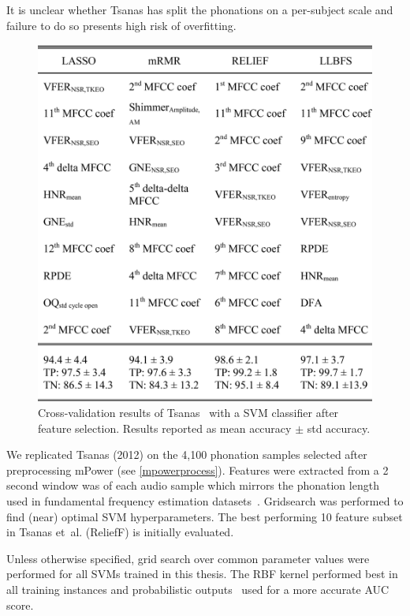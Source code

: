 \documentclass[12pt, twoside]{book}
\begin{document}
\begin{highlight}
It is unclear whether Tsanas has split the phonations on a per-subject scale and failure to do so presents high risk of overfitting.
\end{highlight}

\begin{figure}[h]
\caption{Cross-validation results of Tsanas~\cite{tsanas2012novel} with a SVM classifier after feature selection. Results reported as mean accuracy $\pm$ std accuracy.}
\label{tsanasresults}
\centering\includegraphics[width=0.75\linewidth]{tsanas.png}
\end{figure}
 
We replicated Tsanas (2012) on the 4,100 phonation samples selected after preprocessing mPower (see \ref{mpowerprocess}). Features were extracted from a 2 second window was of each audio sample which mirrors the phonation length used in fundamental frequency estimation datasets~\cite{tsanas2014robust}. Gridsearch was performed to find (near) optimal SVM hyperparameters. The best performing 10 feature subset in Tsanas et~al. (ReliefF) is initially evaluated.

\begin{highlight}
	Unless otherwise specified, grid search over common parameter values were performed for all SVMs trained in this thesis. The RBF kernel performed best in all training instances and probabilistic outputs~\cite{svmprobabilistic} used for a more accurate AUC score.
\end{highlight}
\end{document}
